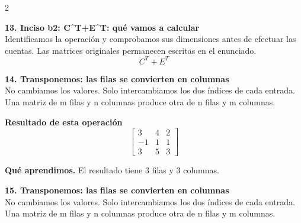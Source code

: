 \documentclass[11pt,a4paper,landscape]{article}
\begin{document}
\begin{multicols*}{2}
\noindent\begin{minipage}{\linewidth}\textbf{13. Inciso b2: C\textasciicircum{}T+E\textasciicircum{}T: qué vamos a calcular}\\[2pt]Identificamos la operación y comprobamos sus dimensiones antes de efectuar las cuentas. Las matrices originales permanecen escritas en el enunciado.
\[C^T+E^T\]
\end{minipage}\par\medskip
\noindent\begin{minipage}{\linewidth}\textbf{14. Transponemos: las filas se convierten en columnas}\\[2pt]No cambiamos los valores. Solo intercambiamos los dos índices de cada entrada. Una matriz de m filas y n columnas produce otra de n filas y m columnas.
\par{}\par\smallskip
\par\smallskip \textbf{Resultado de esta operación}\[\begin{bmatrix}3 & 4 & 2\\-1 & 1 & 1\\3 & 5 & 3\end{bmatrix}\]
\par\smallskip\textbf{Qué aprendimos.} El resultado tiene 3 filas y 3 columnas.
\end{minipage}\par\medskip
\noindent\begin{minipage}{\linewidth}\textbf{15. Transponemos: las filas se convierten en columnas}\\[2pt]No cambiamos los valores. Solo intercambiamos los dos índices de cada entrada. Una matriz de m filas y n columnas produce otra de n filas y m columnas.

\end{minipage}
\end{multicols*}
\end{document}
